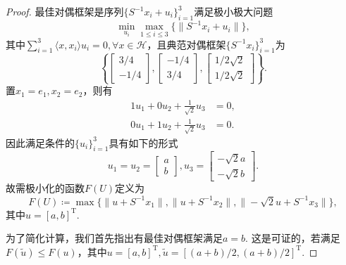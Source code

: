 \documentclass[cn,11pt,a4paper,founder]{elegantpaper}
\newcommand{\calH}{\mathcal{H}}
\DeclareMathOperator{\transpose}{T}
\begin{document}
\begin{proof}
最佳对偶框架是序列\(\{S^{-1}x_i+u_i\}_{i=1}^3\)满足极小极大问题
\[
	\min_{u_i}\max_{1\leqslant i\leqslant 3}\{\|S^{-1}x_i+u_i\|\},
\]
其中\(\sum_{i=1}^3\langle x,x_i\rangle u_i=0,\forall x\in\calH\)，且典范对偶框架\(\{S^{-1}x_i\}_{i=1}^3\)为
\[
	\left\{\begin{bmatrix}
	3/4\\
	-1/4
	\end{bmatrix},
	\begin{bmatrix}
	-1/4\\
	3/4
	\end{bmatrix},
	\begin{bmatrix}
	1/2\sqrt{2}\\
	1/2\sqrt{2}
	\end{bmatrix}\right\}.
\]
置\(x_1=e_1,x_2=e_2\)，则有
\begin{align*}
1u_1+0u_2+\frac{1}{\sqrt{2}}u_3&=0,\\
0u_1+1u_2+\frac{1}{\sqrt{2}}u_3&=0.
\end{align*}
因此满足条件的\(\{u_i\}_{i=1}^3\)具有如下的形式
\[
	u_1=u_2=\begin{bmatrix}
	a\\
	b
	\end{bmatrix},
	u_3=\begin{bmatrix}
	-\sqrt{2}a\\
	-\sqrt{2}b
	\end{bmatrix}.
\]
故需极小化的函数\(F(U)\)定义为
\[
	F(U)\coloneqq\max\big\{\|u+S^{-1}x_1\|,\|u+S^{-1}x_2\|,\|-\sqrt{2}u+S^{-1}x_3\|\big\},
\]
其中\(u=[a,b]^{\transpose}\).

为了简化计算，我们首先指出有最佳对偶框架满足\(a=b\). 这是可证的，若满足\(F(\tilde{u})\leqslant F(u)\)，其中\(u=[a,b]^{\transpose},\tilde{u}=[(a+b)/2,(a+b)/2]^{\transpose}\).


\end{proof}
\end{document}
